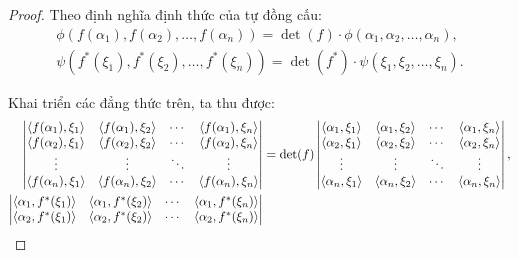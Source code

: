 \begin{proof}
    Theo định nghĩa định thức của tự đồng cấu:
    \[
        \begin{split}
            \phi(f(\alpha_{1}), f(\alpha_{2}), \ldots, f(\alpha_{n})) = \det(f)\cdot\phi(\alpha_{1}, \alpha_{2}, \ldots, \alpha_{n}), \\
            \psi(f^{*}(\xi_{1}), f^{*}(\xi_{2}), \ldots, f^{*}(\xi_{n})) = \det(f^{*})\cdot\psi(\xi_{1}, \xi_{2}, \ldots, \xi_{n}).
        \end{split}
    \]
    
    Khai triển các đẳng thức trên, ta thu được:
    \begingroup{}
    \allowdisplaybreaks{}
    \begin{align*}
        \begin{vmatrix}
            \left\langle{f(\alpha_{1}),\xi_{1}}\right\rangle & \left\langle{f(\alpha_{1}),\xi_{2}}\right\rangle & \cdots & \left\langle{f(\alpha_{1}),\xi_{n}}\right\rangle \\
            \left\langle{f(\alpha_{2}),\xi_{1}}\right\rangle & \left\langle{f(\alpha_{2}),\xi_{2}}\right\rangle & \cdots & \left\langle{f(\alpha_{2}),\xi_{n}}\right\rangle \\
            \vdots                          & \vdots                          & \ddots & \vdots                          \\
            \left\langle{f(\alpha_{n}),\xi_{1}}\right\rangle & \left\langle{f(\alpha_{n}),\xi_{2}}\right\rangle & \cdots & \left\langle{f(\alpha_{n}),\xi_{n}}\right\rangle \\
        \end{vmatrix}
         & = \det(f)
        \begin{vmatrix}
            \left\langle{\alpha_{1},\xi_{1}}\right\rangle & \left\langle{\alpha_{1},\xi_{2}}\right\rangle & \cdots & \left\langle{\alpha_{1},\xi_{n}}\right\rangle \\
            \left\langle{\alpha_{2},\xi_{1}}\right\rangle & \left\langle{\alpha_{2},\xi_{2}}\right\rangle & \cdots & \left\langle{\alpha_{2},\xi_{n}}\right\rangle \\
            \vdots                       & \vdots                       & \ddots & \vdots                       \\
            \left\langle{\alpha_{n},\xi_{1}}\right\rangle & \left\langle{\alpha_{n},\xi_{2}}\right\rangle & \cdots & \left\langle{\alpha_{n},\xi_{n}}\right\rangle \\
        \end{vmatrix}, \\
        \begin{vmatrix}
            \left\langle{\alpha_{1},f^{*}(\xi_{1})}\right\rangle & \left\langle{\alpha_{1},f^{*}(\xi_{2})}\right\rangle & \cdots & \left\langle{\alpha_{1},f^{*}(\xi_{n})}\right\rangle \\
            \left\langle{\alpha_{2},f^{*}(\xi_{1})}\right\rangle & \left\langle{\alpha_{2},f^{*}(\xi_{2})}\right\rangle & \cdots & \left\langle{\alpha_{2},f^{*}(\xi_{n})}\right\rangle \\

\end{vmatrix}
\end{align*}
\end{proof}
